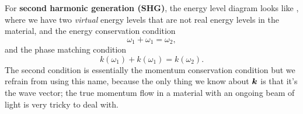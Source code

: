 \documentclass[hyperref, a4paper]{article}
\newcommand*{\concept}[1]{{\textbf{#1}}}
\begin{document}
For \concept{second harmonic generation (SHG)}, 
the energy level diagram looks like , 
where we have two \emph{virtual} energy levels 
that are not real energy levels in the material,
and the energy conservation condition 
\begin{equation}
    \omega_1 + \omega_1 = \omega_2,
\end{equation}
and the phase matching condition
\begin{equation}
    k(\omega_1) + k(\omega_1) = k(\omega_2).
\end{equation}
The second condition is essentially the momentum conservation condition
but we refrain from using this name,
because the only thing we know about $\vb*{k}$
is that it's the wave vector; 
the true momentum flow in a material with an ongoing beam of light 
is very tricky to deal with.
\end{document}
